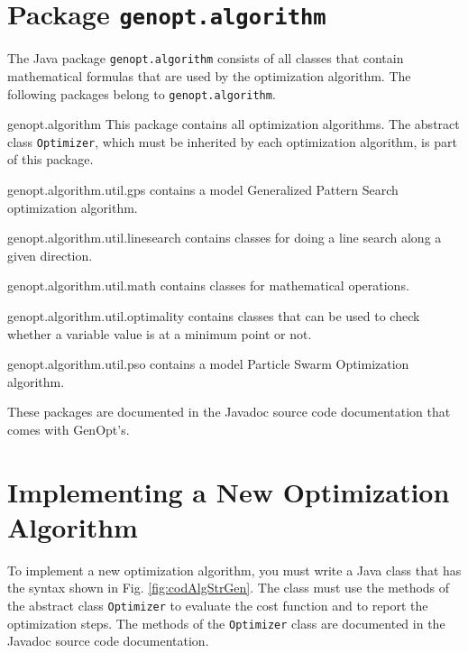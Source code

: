 \section{Package \texttt{genopt.algorithm}}
The Java package \texttt{genopt.algorithm} consists of all classes that contain
mathematical formulas that are used by the optimization algorithm.
The following packages belong to \texttt{genopt.algorithm}.
\begin{codedescription}
\item[genopt.algorithm]
This package contains all optimization algorithms. 
The abstract class \texttt{Optimizer}, which must be inherited 
by each optimization algorithm, is part of this package.

\item[genopt.algorithm.util.gps] contains 
a model Generalized Pattern Search optimization algorithm.

\item[genopt.algorithm.util.linesearch] contains 
classes for doing a line search along a given direction.

\item[genopt.algorithm.util.math] contains 
classes for mathematical operations.

\item[genopt.algorithm.util.optimality] contains 
classes that can be used to check 
whether a variable value is at a minimum point or not.

\item[genopt.algorithm.util.pso] contains 
a model Particle Swarm Optimization algorithm.

\end{codedescription}
These packages are documented in the Javadoc source code documentation
that comes with GenOpt's.

\section{Implementing a New Optimization Algorithm}
\label{sec:impNewOptAlg}
To implement a new optimization algorithm,
you must write a Java class that has 
the syntax shown in Fig. \ref{fig:codAlgStrGen}.
The class must use the methods of the abstract class \texttt{Optimizer} 
to evaluate the cost function and to report the optimization steps.
The methods of the \texttt{Optimizer} class are documented
in the Javadoc source code documentation.\\

